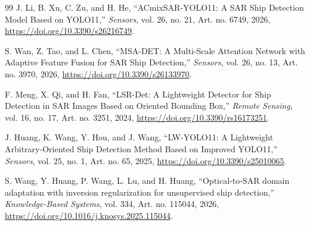 \documentclass[conference]{IEEEtran}
\begin{document}
\begin{thebibliography}{99}
	 J. Li, B. Xu, C. Zu, and H. He, ``ACmixSAR-YOLO11: A SAR Ship Detection Model Based on YOLO11,'' \emph{Sensors}, vol. 26, no. 21, Art. no. 6749, 2026, \url{https://doi.org/10.3390/s26216749}.

	 S. Wan, Z. Tao, and L. Chen, ``MSA-DET: A Multi-Scale Attention Network with Adaptive Feature Fusion for SAR Ship Detection,'' \emph{Sensors}, vol. 26, no. 13, Art. no. 3970, 2026, \url{https://doi.org/10.3390/s26133970}.

	 F. Meng, X. Qi, and H. Fan, ``LSR-Det: A Lightweight Detector for Ship Detection in SAR Images Based on Oriented Bounding Box,'' \emph{Remote Sensing}, vol. 16, no. 17, Art. no. 3251, 2024, \url{https://doi.org/10.3390/rs16173251}.

	 J. Huang, K. Wang, Y. Hou, and J. Wang, ``LW-YOLO11: A Lightweight Arbitrary-Oriented Ship Detection Method Based on Improved YOLO11,'' \emph{Sensors}, vol. 25, no. 1, Art. no. 65, 2025, \url{https://doi.org/10.3390/s25010065}.

	 S. Wang, Y. Huang, P. Wang, L. Lu, and H. Huang, ``Optical-to-SAR domain adaptation with inversion regularization for unsupervised ship detection,'' \emph{Knowledge-Based Systems}, vol. 334, Art. no. 115044, 2026, \url{https://doi.org/10.1016/j.knosys.2025.115044}.
\end{thebibliography}
\end{document}
